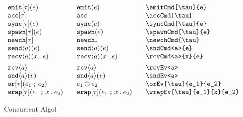 \documentclass[11pt]{article}
\begin{document}
\begin{figure}
  \begin{small}
    \begin{displaymath}
      \begin{array}{l@{\qquad}l@{\qquad}l@{\qquad}l}
        \emitCmd[\tau]{e}     & \emitCmd*{e}        & \verb|\emitCmd[\tau]{e}| \\
        \accCmd[\tau]         & \accCmd*{}          & \verb|\accCmd[\tau]| \\
        \syncCmd[\tau]{e}     & \syncCmd*{e}        & \verb|\syncCmd[\tau]{e}| \\
        \spawnCmd[\tau]{e}    & \spawnCmd*{e}       & \verb|\spawnCmd[\tau]{e}| \\
        \newchCmd{\tau}       & \newchCmd*{\tau}    & \verb|\newchCmd{\tau}| \\
        \sndCmd<a>{e}         & \sndCmd*<a>{e}      & \verb|\sndCmd<a>{e}| \\
        \rcvCmd<a>{x}{e}      & \rcvCmd*<a>{x}{e}   & \verb|\rcvCmd<a>{x}{e}| \\[1ex]
        \rcvEv<a>             & \rcvEv*<a>          & \verb|\rcvEv<a>| \\
        \sndEv<a>{v}          & \sndEv*<a>{v}       & \verb|\sndEv<a>| \\
        \orEv[\tau]{e_1}{e_2}       & \orEv*{e_1}{e_2}    & \verb|\orEv[\tau]{e_1}{e_2}| \\
        \wrapEv[\tau]{e_1}{x}{e_2}  & \wrapEv*{e_1}{x}{e_2} & \verb|\wrapEv[\tau]{e_1}{x}{e_2}|
      \end{array}
    \end{displaymath}
  \end{small}
  \caption{Concurrent Algol}
  \label{fig:conc}
\end{figure}

\restoregeometry
\end{document}
